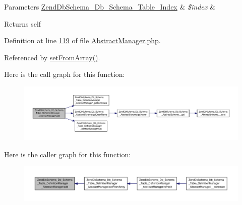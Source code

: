 \begin{DoxyParams}[1]{Parameters}
\hyperlink{classZendDbSchema__Db__Schema__Table__Index}{Zend\-Db\-Schema\-\_\-\-Db\-\_\-\-Schema\-\_\-\-Table\-\_\-\-Index} & {\em \$index} & \\
\hline
\end{DoxyParams}
\begin{DoxyReturn}{Returns}
self 
\end{DoxyReturn}


Definition at line \hyperlink{AbstractManager_8php_source_l00119}{119} of file \hyperlink{AbstractManager_8php_source}{Abstract\-Manager.\-php}.



Referenced by \hyperlink{AbstractManager_8php_source_l00095}{set\-From\-Array()}.



Here is the call graph for this function\-:\nopagebreak
\begin{figure}[H]
\begin{center}
\leavevmode
\includegraphics[width=350pt]{classZendDbSchema__Db__Schema__Table__DefinitionManager__AbstractManager_a6d815884ca03c003ac7f8d633e97f7c6_cgraph}
\end{center}
\end{figure}




Here is the caller graph for this function\-:\nopagebreak
\begin{figure}[H]
\begin{center}
\leavevmode
\includegraphics[width=350pt]{classZendDbSchema__Db__Schema__Table__DefinitionManager__AbstractManager_a6d815884ca03c003ac7f8d633e97f7c6_icgraph}
\end{center}
\end{figure}


